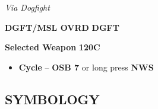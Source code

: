 \begin{tableitemize}
{    \emph{Via Dogfight}

    \begin{subenumerate}
        \item \textbf{DGFT/MSL OVRD} \dotfill \textbf{DGFT}
        \item \textbf{Selected Weapon} \dotfill \textbf{120C}
        \begin{itemize}
            \item \textbf{Cycle} -- \textbf{OSB 7} or long press \textbf{NWS}
        \end{itemize}
    \end{subenumerate}}
\end{tableitemize}

\clearpage

\subsection{SYMBOLOGY}
\begin{tableitemize}
\end{tableitemize}

\clearpage


